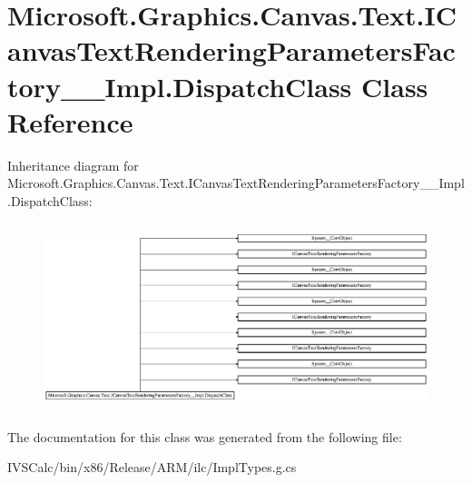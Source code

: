 \hypertarget{class_microsoft_1_1_graphics_1_1_canvas_1_1_text_1_1_i_canvas_text_rendering_parameters_factory_____impl_1_1_dispatch_class}{}\section{Microsoft.\+Graphics.\+Canvas.\+Text.\+I\+Canvas\+Text\+Rendering\+Parameters\+Factory\+\_\+\+\_\+\+Impl.\+Dispatch\+Class Class Reference}
\label{class_microsoft_1_1_graphics_1_1_canvas_1_1_text_1_1_i_canvas_text_rendering_parameters_factory_____impl_1_1_dispatch_class}
Inheritance diagram for Microsoft.\+Graphics.\+Canvas.\+Text.\+I\+Canvas\+Text\+Rendering\+Parameters\+Factory\+\_\+\+\_\+\+Impl.\+Dispatch\+Class\+:\begin{figure}[H]
\begin{center}
\leavevmode
\includegraphics[height=5.490196cm]{class_microsoft_1_1_graphics_1_1_canvas_1_1_text_1_1_i_canvas_text_rendering_parameters_factory_____impl_1_1_dispatch_class}
\end{center}
\end{figure}


The documentation for this class was generated from the following file\+:\begin{DoxyCompactItemize}
\item 
I\+V\+S\+Calc/bin/x86/\+Release/\+A\+R\+M/ilc/Impl\+Types.\+g.\+cs\end{DoxyCompactItemize}
